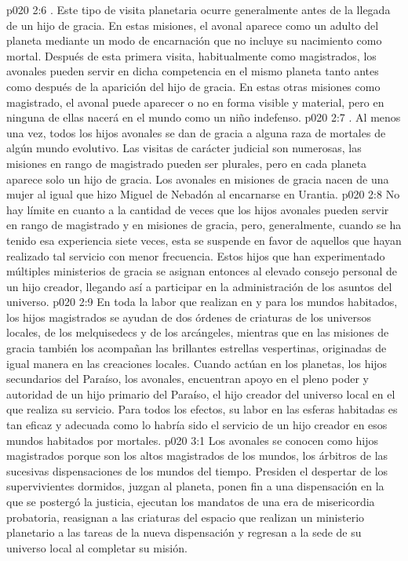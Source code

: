 \vs p020 2:6 . Este tipo de visita planetaria ocurre generalmente antes de la llegada de un hijo de gracia. En estas misiones, el avonal aparece como un adulto del planeta mediante un modo de encarnación que no incluye su nacimiento como mortal. Después de esta primera visita, habitualmente como magistrados, los avonales pueden servir en dicha competencia en el mismo planeta tanto antes como después de la aparición del hijo de gracia. En estas otras misiones como magistrado, el avonal puede aparecer o no en forma visible y material, pero en ninguna de ellas nacerá en el mundo como un niño indefenso.
\vs p020 2:7 . Al menos una vez, todos los hijos avonales se dan de gracia a alguna raza de mortales de algún mundo evolutivo. Las visitas de carácter judicial son numerosas, las misiones en rango de magistrado pueden ser plurales, pero en cada planeta aparece solo un hijo de gracia. Los avonales en misiones de gracia nacen de una mujer al igual que hizo Miguel de Nebadón al encarnarse en Urantia.
\vs p020 2:8 \pc No hay límite en cuanto a la cantidad de veces que los hijos avonales pueden servir en rango de magistrado y en misiones de gracia, pero, generalmente, cuando se ha tenido esa experiencia siete veces, esta se suspende en favor de aquellos que hayan realizado tal servicio con menor frecuencia. Estos hijos que han experimentado múltiples ministerios de gracia se asignan entonces al elevado consejo personal de un hijo creador, llegando así a participar en la administración de los asuntos del universo.
\vs p020 2:9 En toda la labor que realizan en y para los mundos habitados, los hijos magistrados se ayudan de dos órdenes de criaturas de los universos locales, de los melquisedecs y de los arcángeles, mientras que en las misiones de gracia también los acompañan las brillantes estrellas vespertinas, originadas de igual manera en las creaciones locales. Cuando actúan en los planetas, los hijos secundarios del Paraíso, los avonales, encuentran apoyo en el pleno poder y autoridad de un hijo primario del Paraíso, el hijo creador del universo local en el que realiza su servicio. Para todos los efectos, su labor en las esferas habitadas es tan eficaz y adecuada como lo habría sido el servicio de un hijo creador en esos mundos habitados por mortales.
\vs p020 3:1 Los avonales se conocen como hijos magistrados porque son los altos magistrados de los mundos, los árbitros de las sucesivas dispensaciones de los mundos del tiempo. Presiden el despertar de los supervivientes dormidos, juzgan al planeta, ponen fin a una dispensación en la que se postergó la justicia, ejecutan los mandatos de una era de misericordia probatoria, reasignan a las criaturas del espacio que realizan un ministerio planetario a las tareas de la nueva dispensación y regresan a la sede de su universo local al completar su misión.
